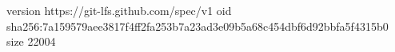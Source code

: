 version https://git-lfs.github.com/spec/v1
oid sha256:7a159579aee3817f4ff2fa253b7a23ad3e09b5a68c454dbf6d92bbfa5f4315b0
size 22004
